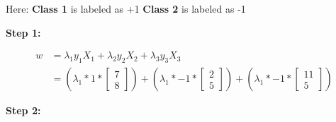 \documentclass[12pt]{report}
\begin{document}
Here:\newline
\textbf{Class 1} is labeled as +1 \newline
\textbf{Class 2} is labeled as -1


\textbf{Step 1:}

\begin{equation*}
	\begin{aligned}
		w & = \lambda_{1}y_{1}X_{1} + \lambda_{2}y_{2}X_{2}   + \lambda_{3}y_{3}X_{3}                                      \\
		  & = (\lambda_{1} * 1 * \begin{bmatrix}
			                         7 \\
			                         8
		                         \end{bmatrix}) + (\lambda_{1} * -1 * \begin{bmatrix}
			                                                              2 \\
			                                                              5
		                                                              \end{bmatrix})  + (\lambda_{1} * -1 * \begin{bmatrix}
			                                                                                                    11 \\
			                                                                                                    5
		                                                                                                    \end{bmatrix})
	\end{aligned}
\end{equation*}

\vspace{20pt}

\textbf{Step 2:}
\end{document}
